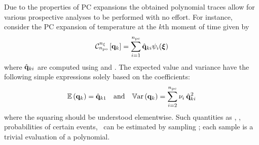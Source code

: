 Due to the properties of PC expansions the obtained polynomial traces allow for
various prospective analyses to be performed with no effort. For instance,
consider the PC expansion of temperature at the $k$th moment of time given by
\begin{equation} \elabel{pc-k}
  \oPC{\nvars}{\pcorder}{\vTO_k} = \sum_{i = 1}^{\pcterms} \pcc{\vTO}_{ki} \pcb_i(\vZ)
\end{equation}
where $\hat{\mathbf{q}}_{ki}$ are computed using  and
. The expected value and variance have the following simple
expressions solely based on the coefficients:
\begin{equation} \elabel{pc-moments}
  \oExp{\vTO_k} = \pcc{\vTO}_{k1} \hspace{1em} \text{and} \hspace{1em} \oVar{\vTO_k} = \sum_{i = 2}^{\pcterms} \pcn_i \: \pcc{\vTO}_{ki}^2
\end{equation}
where the squaring should be understood elementwise. Such quantities as \cdfs,
\pdfs, probabilities of certain events, \etc\ can be estimated by sampling
; each sample is a trivial evaluation of a polynomial.
